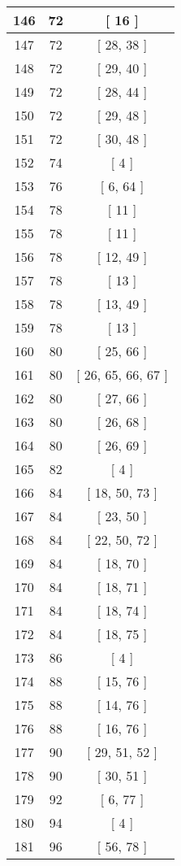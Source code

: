 \begin{center}
\begin{longtable}[H]{|| c c c ||}
\hline
146 & 72 & [ 16 ] \\ 
\hline
147 & 72 & [ 28, 38 ] \\ 
\hline
148 & 72 & [ 29, 40 ] \\ 
\hline
149 & 72 & [ 28, 44 ] \\ 
\hline
150 & 72 & [ 29, 48 ] \\ 
\hline
151 & 72 & [ 30, 48 ] \\ 
\hline
152 & 74 & [ 4 ] \\ 
\hline
153 & 76 & [ 6, 64 ] \\ 
\hline
154 & 78 & [ 11 ] \\ 
\hline
155 & 78 & [ 11 ] \\ 
\hline
156 & 78 & [ 12, 49 ] \\ 
\hline
157 & 78 & [ 13 ] \\ 
\hline
158 & 78 & [ 13, 49 ] \\ 
\hline
159 & 78 & [ 13 ] \\ 
\hline
160 & 80 & [ 25, 66 ] \\ 
\hline
161 & 80 & [ 26, 65, 66, 67 ] \\ 
\hline
162 & 80 & [ 27, 66 ] \\ 
\hline
163 & 80 & [ 26, 68 ] \\ 
\hline
164 & 80 & [ 26, 69 ] \\ 
\hline
165 & 82 & [ 4 ] \\ 
\hline
166 & 84 & [ 18, 50, 73 ] \\ 
\hline
167 & 84 & [ 23, 50 ] \\ 
\hline
168 & 84 & [ 22, 50, 72 ] \\ 
\hline
169 & 84 & [ 18, 70 ] \\ 
\hline
170 & 84 & [ 18, 71 ] \\ 
\hline
171 & 84 & [ 18, 74 ] \\ 
\hline
172 & 84 & [ 18, 75 ] \\ 
\hline
173 & 86 & [ 4 ] \\ 
\hline
174 & 88 & [ 15, 76 ] \\ 
\hline
175 & 88 & [ 14, 76 ] \\ 
\hline
176 & 88 & [ 16, 76 ] \\ 
\hline
177 & 90 & [ 29, 51, 52 ] \\ 
\hline
178 & 90 & [ 30, 51 ] \\ 
\hline
179 & 92 & [ 6, 77 ] \\ 
\hline
180 & 94 & [ 4 ] \\ 
\hline
181 & 96 & [ 56, 78 ] \\ 

\end{longtable}
\end{center}
